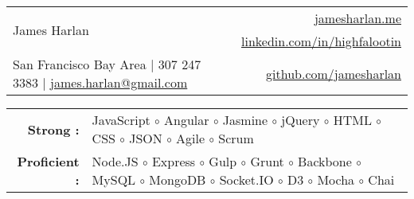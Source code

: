 \documentclass[11pt]{article}
\begin{document}
\setlength{\tabcolsep}{0in}

\begin{center}
\begin{tabularx}{1.0\textwidth}{l X r}
  \multirow{2}{*}{\Huge{James Harlan}}& & \href{http://www.jamesharlan.me}{\color{blue}jamesharlan.me} \\
   & & \href{https://www.linkedin.com/in/highfalootin}{\color{blue}linkedin.com/in/highfalootin} \\
  San Francisco Bay Area $\vert$ 307 247 3383 $\vert$ \href{mailto:james.harlan@gmail.com}{\color{blue}james.harlan@gmail.com} & & \href{http://github.com/jamesharlan}{\color{blue}github.com/jamesharlan}
\end{tabularx}

\vspace{2mm}


\vspace{2mm}

\begin{tabularx}{\textwidth}{r X}
  \textbf{Strong : } & JavaScript $\circ$ Angular $\circ$ Jasmine $\circ$ jQuery $\circ$ HTML $\circ$ CSS $\circ$ JSON $\circ$  Agile $\circ$ Scrum \\
  \textbf{Proficient : } & Node.JS $\circ$ Express $\circ$ Gulp $\circ$ Grunt $\circ$ Backbone $\circ$ MySQL $\circ$ MongoDB $\circ$ Socket.IO $\circ$ D3 $\circ$ Mocha $\circ$ Chai \\
\end{tabularx}



\end{center}
\end{document}
